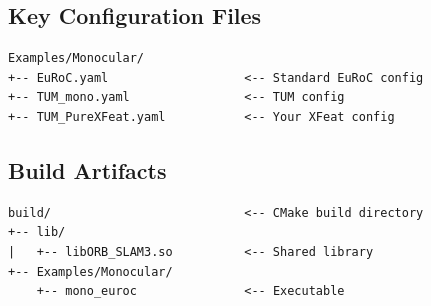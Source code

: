 \subsection{Key Configuration Files}

\begin{verbatim}
Examples/Monocular/
+-- EuRoC.yaml                   <-- Standard EuRoC config
+-- TUM_mono.yaml                <-- TUM config
+-- TUM_PureXFeat.yaml           <-- Your XFeat config
\end{verbatim}

\subsection{Build Artifacts}

\begin{verbatim}
build/                           <-- CMake build directory
+-- lib/
|   +-- libORB_SLAM3.so          <-- Shared library
+-- Examples/Monocular/
    +-- mono_euroc               <-- Executable
\end{verbatim}
